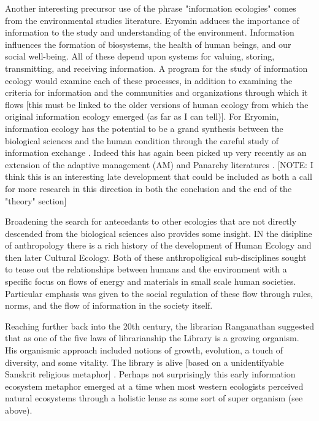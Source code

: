 Another interesting precursor use of the phrase "information ecologies" comes from the environmental studies literature. Eryomin adduces the importance of information to the study and understanding of the environment. Information influences the formation of biosystems, the health of human beings, and our social well-being. All of these depend upon systems for valuing, storing, transmitting, and receiving information. A program for the study of information ecology would examine each of these processes, in addition to examining the criteria for information and the communities and organizations through which it flows [this must be linked to the older versions of human ecology from which the original information ecology emerged (as far as I can tell)]. For Eryomin, information ecology has the potential to be a grand synthesis between the biological sciences and the human condition through the careful study of information exchange \cite{eryomin_information_1998}. Indeed this has again been picked up very recently as an extension of the adaptive management (AM) and Panarchy literatures \cite{eddy_information_2014}. [NOTE: I think this is an interesting late development that could be included as both a call for more research in this direction in both the conclusion and the end of the "theory" section]

Broadening the search for antecedants to other ecologies that are not directly descended from the biological sciences also provides some insight. IN the disipline of anthropology there is a rich history of the development of Human Ecology and then later Cultural Ecology. Both of these anthropoligical sub-disciplines sought to tease out the relationships between humans and the environment with a specific focus on flows of energy and materials in small scale human societies. Particular emphasis was given to the social regulation of these flow through rules, norms, and the flow of information in the society itself. 
 
Reaching further back into the 20th century, the librarian Ranganathan suggested that as one of the five laws of librarianship the Library is a growing organism. His organismic approach included notions of growth, evolution, a touch of diversity, and some vitality. The library is alive [based on a unidentifyable Sanskrit religious metaphor] \cite{ranganathan_1931}. Perhaps not surprisingly this early information ecosystem metaphor emerged at a time when most western ecologists perceived natural ecosystems through a holistic lense as some sort of super organism (see above).
